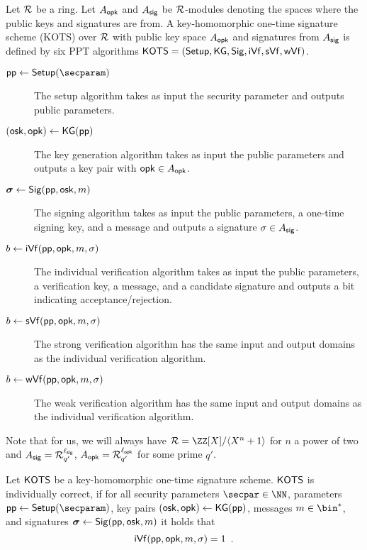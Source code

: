 \begin{definition}\label{def:hots}
  Let $\mathcal{R}$ be a ring. Let $A_{\mathsf{opk}}$ and $A_{\mathsf{sig}}$ be $\mathcal{R}$-modules denoting the spaces where the public keys and signatures are from.
  A key-homomorphic one-time signature scheme (KOTS) over $\mathcal{R}$ with public key space $A_{\mathsf{opk}}$ and signatures from $A_{\mathsf{sig}}$
  is defined by six PPT algorithms $\mathsf{KOTS}=(\mathsf{Setup},\mathsf{KG},\mathsf{Sig},\mathsf{iVf}, \mathsf{sVf}, \mathsf{wVf})$.
  \begin{description}
    \item[$\params\gets\setup(\secparam)$] The setup algorithm takes as input the security parameter and outputs public parameters.
    \item[$(\mathsf{osk},\mathsf{opk}) \gets \mathsf{KG}(\mathsf{pp})$] The key generation algorithm takes as input the public parameters and outputs a key pair with $\mathsf{opk}\in A_{\mathsf{opk}}$.
    \item[$\boldsymbol{\sigma} \gets \mathsf{Sig}(\mathsf{pp},\mathsf{osk},m)$] The signing algorithm takes as input the public parameters, a one-time signing key, and a message and outputs a signature $\sigma\in A_{\mathsf{sig}}$.
    \item[$b\gets \mathsf{iVf}(\mathsf{pp},\mathsf{opk},m,\sigma)$] The individual verification algorithm takes as input the public parameters, a verification key, a message, and a candidate signature and outputs a bit indicating acceptance/rejection.
    \item[$b\gets \mathsf{sVf}(\mathsf{pp},\mathsf{opk},m,\sigma)$] The strong verification algorithm has the same input and output domains as the individual verification algorithm.
    \item[$b\gets \mathsf{wVf}(\mathsf{pp},\mathsf{opk},m,\sigma)$] The weak verification algorithm has the same input and output domains as the individual verification algorithm.
  \end{description}
\end{definition}
Note that for us, we will always have $\ring = \ZZ[X]/\langle X^n+1\rangle$ for $n$ a power of two and $A_{\mathsf{sig}} = \mathcal{R}_{q'}^{\ell_{\mathsf{sig}}}$, $A_{\mathsf{opk}} = \mathcal{R}_{q'}^{\ell_{\mathsf{opk}}}$ for some prime $q'$.

\begin{definition}
Let $\mathsf{KOTS}$ be a key-{}homo\-morphic one-time signature scheme.
$\mathsf{KOTS}$ is individually correct, if for all security parameters $\secpar\in\NN$, parameters $\params \gets \setup(\secparam)$, key pairs $(\mathsf{osk},\mathsf{opk}) \gets \mathsf{KG}(\mathsf{pp})$, messages $m\in\bin^*$, and signatures $\boldsymbol{\sigma} \gets \mathsf{Sig}(\mathsf{pp},\mathsf{osk},m)$ it holds that
\[
  \mathsf{iVf}(\mathsf{pp},\mathsf{opk},m,\sigma)=1\enspace.
\]
\end{definition}


